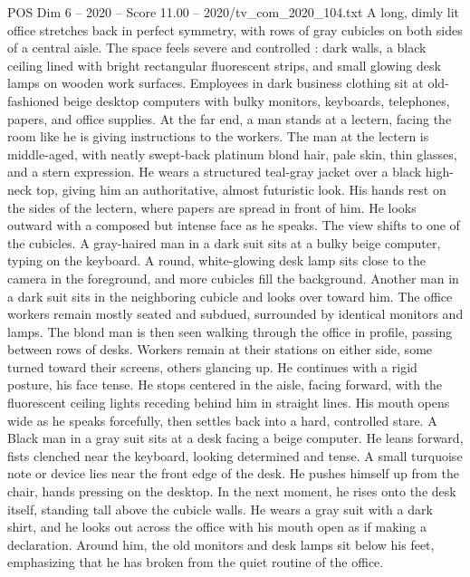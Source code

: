 \begin{textsample}{POS Dim 6 – 2020 – Score 11.00 – 2020/tv\_com\_2020\_104.txt}  \label{ex:f6_pos_061}
A long, dimly lit office stretches back in perfect symmetry, with rows of gray cubicles on both sides of a central aisle.
The space feels severe and controlled : dark walls, a black ceiling lined with bright rectangular fluorescent strips, and small glowing desk lamps on wooden work surfaces.
Employees in dark business clothing sit at old-fashioned beige desktop computers with bulky monitors, keyboards, telephones, papers, and office supplies.
At the far end, a man stands at a lectern, facing the room like he is giving instructions to the workers.
The man at the lectern is middle-aged, with neatly swept-back platinum blond hair, pale skin, thin glasses, and a stern expression.
He wears a structured teal-gray jacket over a black high-neck top, giving him an authoritative, almost futuristic look.
His hands rest on the sides of the lectern, where papers are spread in front of him.
He looks outward with a composed but intense face as he speaks.
The view shifts to one of the cubicles.
A gray-haired man in a dark suit sits at a bulky beige computer, typing on the keyboard.
A round, white-glowing desk lamp sits close to the camera in the foreground, and more cubicles fill the background.
Another man in a dark suit sits in the neighboring cubicle and looks over toward him.
The office workers remain mostly seated and subdued, surrounded by identical monitors and lamps.
The blond man is then seen walking through the office in profile, passing between rows of desks.
Workers remain at their stations on either side, some turned toward their screens, others glancing up.
He continues with a rigid posture, his face tense.
He stops centered in the aisle, facing forward, with the fluorescent ceiling lights receding behind him in straight lines.
His mouth opens wide as he speaks forcefully, then settles back into a hard, controlled stare.
A Black man in a gray suit sits at a desk facing a beige computer.
He leans forward, fists clenched near the keyboard, looking determined and tense.
A small turquoise note or device lies near the front edge of the desk.
He pushes himself up from the chair, hands pressing on the desktop.
In the next moment, he rises onto the desk itself, standing tall above the cubicle walls.
He wears a gray suit with a dark shirt, and he looks out across the office with his mouth open as if making a declaration.
Around him, the old monitors and desk lamps sit below his feet, emphasizing that he has broken from the quiet routine of the office.

\end{textsample}
